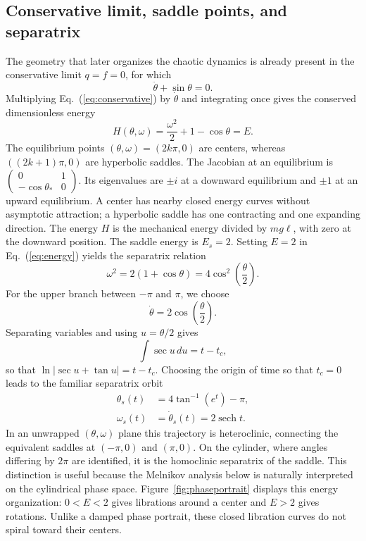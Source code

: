 \documentclass[aps,prb,reprint,floatfix]{revtex4-2}
\DeclareMathOperator{\sech}{sech}
\begin{document}
\subsection{Conservative limit, saddle points, and separatrix}
\label{subsec:separatrix}

The geometry that later organizes the chaotic dynamics is already present in the conservative limit $q=f=0$, for which
\begin{equation}
 \ddot\theta+\sin\theta=0.
\label{eq:conservative}
\end{equation}
Multiplying Eq.~(\ref{eq:conservative}) by $\dot\theta$ and integrating once gives the conserved dimensionless energy
\begin{equation}
 H(\theta,\omega)=\frac{\omega^2}{2}+1-\cos\theta=E.
\label{eq:energy}
\end{equation}
The equilibrium points $(\theta,\omega)=(2k\pi,0)$ are centers, whereas $((2k+1)\pi,0)$ are hyperbolic saddles. The Jacobian at an equilibrium is $\left(\begin{smallmatrix}0&1\\-\cos\theta_*&0\end{smallmatrix}\right)$. Its eigenvalues are $\pm i$ at a downward equilibrium and $\pm1$ at an upward equilibrium. A center has nearby closed energy curves without asymptotic attraction; a hyperbolic saddle has one contracting and one expanding direction. The energy $H$ is the mechanical energy divided by $mg\ell$, with zero at the downward position. The saddle energy is $E_s=2$. Setting $E=2$ in Eq.~(\ref{eq:energy}) yields the separatrix relation
\begin{equation}
 \omega^2=2(1+\cos\theta)=4\cos^2\!\left(\frac{\theta}{2}\right).
\label{eq:separatrix_relation}
\end{equation}
For the upper branch between $-\pi$ and $\pi$, we choose
\begin{equation}
 \dot\theta=2\cos\!\left(\frac{\theta}{2}\right).
\label{eq:separatrix_ode}
\end{equation}
Separating variables and using $u=\theta/2$ gives
\begin{equation}
 \int \sec u\,du=t-t_c,
\label{eq:separatrix_integral}
\end{equation}
so that $\ln|\sec u+\tan u|=t-t_c$. Choosing the origin of time so that $t_c=0$ leads to the familiar separatrix orbit
\begin{align}
 \theta_s(t)&=4\tan^{-1}(e^t)-\pi,\label{eq:theta_sep}\\
 \omega_s(t)&=\dot\theta_s(t)=2\sech t.\label{eq:omega_sep}
\end{align}
In an unwrapped $(\theta,\omega)$ plane this trajectory is heteroclinic, connecting the equivalent saddles at $(-\pi,0)$ and $(\pi,0)$. On the cylinder, where angles differing by $2\pi$ are identified, it is the homoclinic separatrix of the saddle. This distinction is useful because the Melnikov analysis below is naturally interpreted on the cylindrical phase space. Figure~\ref{fig:phaseportrait} displays this energy organization: $0<E<2$ gives librations around a center and $E>2$ gives rotations. Unlike a damped phase portrait, these closed libration curves do not spiral toward their centers.
\end{document}
